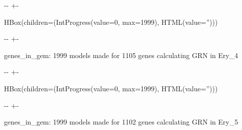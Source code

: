 \documentclass[letterpaper,10pt,english]{sphinxmanual}
\newlength\nbsphinxcodecellspacing
\begin{document}
{

\kern-\sphinxverbatimsmallskipamount\kern-\baselineskip
\kern+\FrameHeightAdjust\kern-\fboxrule
\vspace{\nbsphinxcodecellspacing}

\begin{sphinxVerbatim}[commandchars=\\\{\}]
HBox(children=(IntProgress(value=0, max=1999), HTML(value='')))
\end{sphinxVerbatim}
}

{

\kern-\sphinxverbatimsmallskipamount\kern-\baselineskip
\kern+\FrameHeightAdjust\kern-\fboxrule
\vspace{\nbsphinxcodecellspacing}

\begin{sphinxVerbatim}[commandchars=\\\{\}]

genes\_in\_gem: 1999
models made for 1105 genes
calculating GRN in Ery\_4
\end{sphinxVerbatim}
}

{

\kern-\sphinxverbatimsmallskipamount\kern-\baselineskip
\kern+\FrameHeightAdjust\kern-\fboxrule
\vspace{\nbsphinxcodecellspacing}

\begin{sphinxVerbatim}[commandchars=\\\{\}]
HBox(children=(IntProgress(value=0, max=1999), HTML(value='')))
\end{sphinxVerbatim}
}

{

\kern-\sphinxverbatimsmallskipamount\kern-\baselineskip
\kern+\FrameHeightAdjust\kern-\fboxrule
\vspace{\nbsphinxcodecellspacing}

\begin{sphinxVerbatim}[commandchars=\\\{\}]

genes\_in\_gem: 1999
models made for 1102 genes
calculating GRN in Ery\_5
\end{sphinxVerbatim}
}
\end{document}
